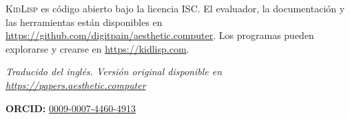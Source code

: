 \documentclass[10pt,letterpaper,twocolumn]{article}
\newcommand{\kidlisp}{\textsc{KidLisp}}
\begin{document}
\kidlisp{} es código abierto bajo la licencia ISC. El evaluador, la documentación y las herramientas están disponibles en \url{https://github.com/digitpain/aesthetic.computer}. Los programas pueden explorarse y crearse en \url{https://kidlisp.com}.

\vspace{0.5em}
\noindent\textit{Traducido del inglés. Versión original disponible en \url{https://papers.aesthetic.computer}}

\vspace{0.5em}
\noindent\textbf{ORCID:} \href{https://orcid.org/0009-0007-4460-4913}{0009-0007-4460-4913}




\end{document}
